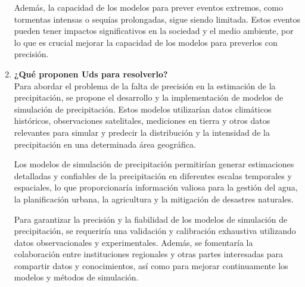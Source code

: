 \documentclass{article}
\begin{document}
\begin{enumerate}
    Además, la capacidad de los modelos para prever eventos extremos, como tormentas intensas o sequías prolongadas, sigue siendo limitada. Estos eventos pueden tener impactos significativos en la sociedad y el medio ambiente, por lo que es crucial mejorar la capacidad de los modelos para preverlos con precisión.
    
    \item \textbf{¿Qué proponen Uds para resolverlo?} \\
    
    Para abordar el problema de la falta de precisión en la estimación de la precipitación, se propone el desarrollo y la implementación de modelos de simulación de precipitación. Estos modelos utilizarían datos climáticos históricos, observaciones satelitales, mediciones en tierra y otros datos relevantes para simular y predecir la distribución y la intensidad de la precipitación en una determinada área geográfica.

    Los modelos de simulación de precipitación permitirían generar estimaciones detalladas y confiables de la precipitación en diferentes escalas temporales y espaciales, lo que proporcionaría información valiosa para la gestión del agua, la planificación urbana, la agricultura y la mitigación de desastres naturales.

    Para garantizar la precisión y la fiabilidad de los modelos de simulación de precipitación, se requeriría una validación y calibración exhaustiva utilizando datos observacionales y experimentales. Además, se fomentaría la colaboración entre instituciones regionales y otras partes interesadas para compartir datos y conocimientos, así como para mejorar continuamente los modelos y métodos de simulación.
\end{enumerate}
\end{document}
